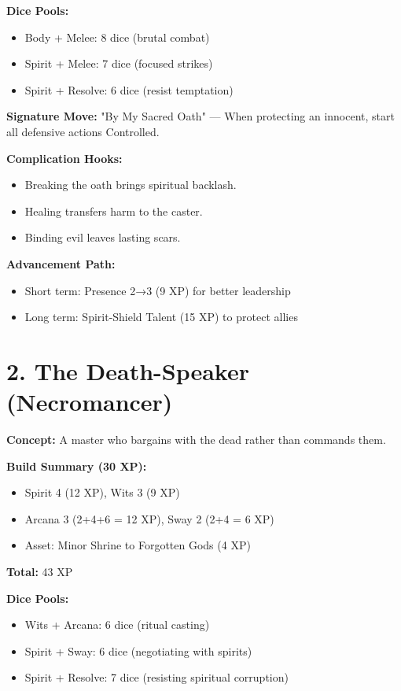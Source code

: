 \textbf{Dice Pools:}
\begin{itemize}
  \item Body + Melee: 8 dice (brutal combat)
  \item Spirit + Melee: 7 dice (focused strikes)
  \item Spirit + Resolve: 6 dice (resist temptation)
\end{itemize}

\textbf{Signature Move:} "By My Sacred Oath" — When protecting an innocent, start all defensive actions Controlled.

\textbf{Complication Hooks:}
\begin{itemize}
  \item Breaking the oath brings spiritual backlash.
  \item Healing transfers harm to the caster.
  \item Binding evil leaves lasting scars.
\end{itemize}

\textbf{Advancement Path:}
\begin{itemize}
  \item Short term: Presence 2→3 (9 XP) for better leadership
  \item Long term: Spirit-Shield Talent (15 XP) to protect allies
\end{itemize}

\section{2. The Death-Speaker (Necromancer)}

\textbf{Concept:} A master who bargains with the dead rather than commands them.

\textbf{Build Summary (30 XP):}
\begin{itemize}
  \item Spirit 4 (12 XP), Wits 3 (9 XP)
  \item Arcana 3 (2+4+6 = 12 XP), Sway 2 (2+4 = 6 XP)
  \item Asset: Minor Shrine to Forgotten Gods (4 XP)
\end{itemize}
\textbf{Total:} 43 XP

\textbf{Dice Pools:}
\begin{itemize}
  \item Wits + Arcana: 6 dice (ritual casting)
  \item Spirit + Sway: 6 dice (negotiating with spirits)
  \item Spirit + Resolve: 7 dice (resisting spiritual corruption)
\end{itemize}


